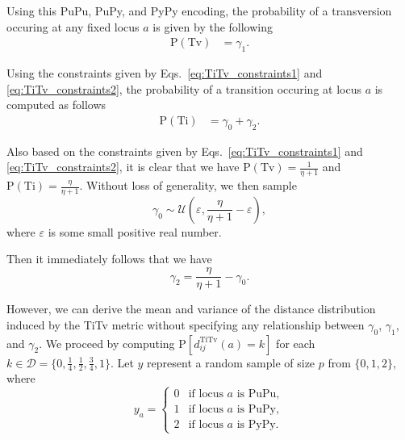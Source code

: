 \documentclass[10pt,letterpaper]{article}\usepackage[]{graphicx}\usepackage[]{color}
\begin{document}
Using this PuPu, PuPy, and PyPy encoding, the probability of a transversion occuring at any fixed locus $a$ is given by the following
%
\begin{equation}\label{eq:prob_Tv}
\begin{aligned}
\text{P}(\text{Tv}) &= \gamma_1.
\end{aligned}
\end{equation}

Using the constraints given by Eqs.~\ref{eq:TiTv_constraints1} and \ref{eq:TiTv_constraints2}, the probability of a transition occuring at locus $a$ is computed as follows
%
\begin{equation}\label{eq:prob_Ti}
\begin{aligned}
\text{P}(\text{Ti}) &= \gamma_0 + \gamma_2.
\end{aligned}
\end{equation}

Also based on the constraints given by Eqs.~\ref{eq:TiTv_constraints1} and \ref{eq:TiTv_constraints2}, it is clear that we have $\text{P}(\text{Tv}) = \frac{1}{\eta + 1}$ and $\text{P}(\text{Ti}) = \frac{\eta}{\eta + 1}$. Without loss of generality, we then sample 
%
\begin{equation}\label{eq:gamma0}
\gamma_0 \sim \mathcal{U}\left(\varepsilon,\frac{\eta}{\eta + 1} - \varepsilon\right),
\end{equation}
where $\varepsilon$ is some small positive real number.

Then it immediately follows that we have 
%
\begin{equation}\label{eq:gamma2}
\gamma_2 = \frac{\eta}{\eta + 1} - \gamma_0.
\end{equation}

However, we can derive the mean and variance of the distance distribution induced by the TiTv metric without specifying any relationship between $\gamma_0$, $\gamma_1$, and $\gamma_2$. We proceed by computing $\text{P}\left[d^\text{TiTv}_{ij}(a) = k\right]$ for each $k \in \mathcal{D} = \bigl\{0,\frac{1}{4},\frac{1}{2},\frac{3}{4},1\bigr\}$. Let $y$ represent a random sample of size $p$ from $\{0,1,2\}$, where 
%
\begin{equation}\label{eq:yvec}
y_a = \begin{cases}
0 & \text{if locus } a \text{ is PuPu}, \\
1 & \text{if locus } a \text{ is PuPy}, \\
2 & \text{if locus } a \text{ is PyPy}.
\end{cases}
\end{equation}
\end{document}
